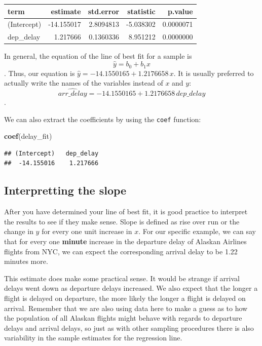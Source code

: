 \documentclass[]{tufte-book}
\newenvironment{Shaded}{\begin{snugshade}}{\end{snugshade}}
\newcommand{\KeywordTok}[1]{\textcolor[rgb]{0.13,0.29,0.53}{\textbf{{#1}}}}
\newcommand{\NormalTok}[1]{{#1}}
\begin{document}
\begin{tabular}{l|r|r|r|r}
\hline
term & estimate & std.error & statistic & p.value\\
\hline
(Intercept) & -14.155017 & 2.8094813 & -5.038302 & 0.0000071\\
\hline
dep\_delay & 1.217666 & 0.1360336 & 8.951212 & 0.0000000\\
\hline
\end{tabular}

In general, the equation of the line of best fit for a sample is
\[\hat{y} = b_0 + b_1 x\]. Thus, our equation is
\(\hat{y} = -14.1550165 + 1.2176658 \, x\). It is usually preferred to
actually write the names of the variables instead of \(x\) and \(y\):
\[\widehat{arr\_delay} = -14.1550165 + 1.2176658 \, dep\_delay\].

We can also extract the coefficients by using the \texttt{coef}
function:

\begin{Shaded}
\begin{Highlighting}[]
\KeywordTok{coef}\NormalTok{(delay_fit)}
\end{Highlighting}
\end{Shaded}

\begin{verbatim}
## (Intercept)   dep_delay 
##  -14.155016    1.217666
\end{verbatim}

\subsection{Interpretting the slope}\label{interpretting-the-slope}

After you have determined your line of best fit, it is good practice to
interpret the results to see if they make sense. Slope is defined as
rise over run or the change in \(y\) for every one unit increase in
\(x\). For our specific example, we can say that for every one
\textbf{minute} increase in the departure delay of Alaskan Airlines
flights from NYC, we can expect the corresponding arrival delay to be
1.22 minutes more.

This estimate does make some practical sense. It would be strange if
arrival delays went down as departure delays increased. We also expect
that the longer a flight is delayed on departure, the more likely the
longer a flight is delayed on arrival. Remember that we are also using
data here to make a guess as to how the population of all Alaskan
flights might behave with regards to departure delays and arrival
delays, so just as with other sampling procedures there is also
variability in the sample estimates for the regression line.
\end{document}
